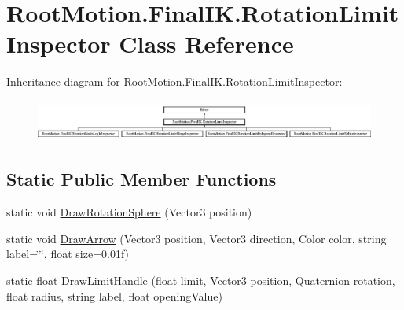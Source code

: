 \hypertarget{class_root_motion_1_1_final_i_k_1_1_rotation_limit_inspector}{}\section{Root\+Motion.\+Final\+I\+K.\+Rotation\+Limit\+Inspector Class Reference}
\label{class_root_motion_1_1_final_i_k_1_1_rotation_limit_inspector}
Inheritance diagram for Root\+Motion.\+Final\+I\+K.\+Rotation\+Limit\+Inspector\+:\begin{figure}[H]
\begin{center}
\leavevmode
\includegraphics[height=1.363636cm]{class_root_motion_1_1_final_i_k_1_1_rotation_limit_inspector}
\end{center}
\end{figure}
\subsection*{Static Public Member Functions}
\begin{DoxyCompactItemize}
\item 
static void \mbox{\hyperlink{class_root_motion_1_1_final_i_k_1_1_rotation_limit_inspector_a748676248cb7e03ff1228f61d960676d}{Draw\+Rotation\+Sphere}} (Vector3 position)
\item 
static void \mbox{\hyperlink{class_root_motion_1_1_final_i_k_1_1_rotation_limit_inspector_af855634477f7add508a6babbc97d20d6}{Draw\+Arrow}} (Vector3 position, Vector3 direction, Color color, string label=\char`\"{}\char`\"{}, float size=0.\+01f)
\item 
static float \mbox{\hyperlink{class_root_motion_1_1_final_i_k_1_1_rotation_limit_inspector_a70c4e2682ace49d0d31a552a2f9835bc}{Draw\+Limit\+Handle}} (float limit, Vector3 position, Quaternion rotation, float radius, string label, float opening\+Value)
\end{DoxyCompactItemize}
